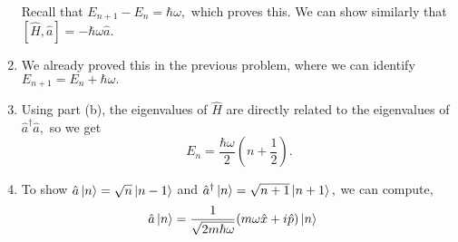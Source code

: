 \documentclass{article}
\numberwithin{equation}{section}
\begin{document}
\begin{problem}[3.3.1]
\begin{enumerate}[label=(\alph*)]
\begin{align}
        \end{align}
        Recall that $E_{n+1} - E_n  = \hbar\omega,$ which proves this. We can show similarly that $[\hat{H},\hat{a}]=-\hbar\omega\hat{a}.$
        \item We already proved this in the previous problem, where we can identify $E_{n+1} = E_n + \hbar\omega.$
        \item Using part (b), the eigenvalues of $\hat{H}$ are directly related to the eigenvalues of $\hat{a}^\dagger\hat{a},$ so we get 
        \begin{equation}
            E_n = \frac{\hbar\omega}{2}\left(n+\frac{1}{2}\right).
        \end{equation}
        \item To show $\hat{a}\ket{n} = \sqrt{n}\ket{n-1}$ and $\hat{a}^\dagger\ket{n} = \sqrt{n+1}\ket{n+1},$ we can compute,
        \begin{align}
            \hat{a}\ket{n} &= \frac{1}{\sqrt{2m\hbar\omega}}(m\omega\hat{x}+i\hat{p})\ket{n }
        \end{align}
    \end{enumerate}
\end{problem}
\end{document}
